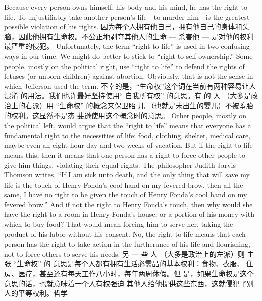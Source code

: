 \begin{paracol}{2}
Because every person owns himself, his body and his mind, he
has the right to life. To unjustifiably take another person's
life---to murder him---is the greatest possible violation of his
rights.
\switchcolumn
因为每个人拥有他自己，拥有他自己的身体和头脑，因此他拥有生命权。不公正地剥夺其他人的生命 --- 杀害他 --- 是对他的权利最严重的侵犯。
\switchcolumn*
Unfortunately, the term ``right to life'' is used in two confusing ways in our time. We might do better to stick to ``right to self-ownership.'' Some people, mostly on the political right, use
``right to life'' to defend the rights of fetuses (or unborn children) against abortion. Obviously, that is not the sense in which Jefferson used the term.
\switchcolumn
不幸的是，“生命权”这个词在当前有两种容易让人混淆
的用法。我们也许最好坚持使用“ 自我所有权” 的意思。有
的 人 （大多是政治上的右派）用 “生命权” 的概念来保卫胎
儿 （也就是未出生的婴儿）不被堕胎的权利。这显然不是杰
斐逊使用这个概念时的意思。
\switchcolumn
Other people, mostly on the political left, would argue that
the ``right to life'' means that everyone has a fundamental right
to the necessities of life: food, clothing, shelter, medical care,
maybe even an eight-hour day and two weeks of vacation. But
if the right to life means this, then it means that one person has
a right to force other people to give him things, violating their
equal rights. The philosopher Judith Jarvis Thomson writes, ``If
I am sick unto death, and the only thing that will save my life is
the touch of Henry Fonda's cool hand on my fevered brow, then
all the same, I have no right to be given the touch of Henry
Fonda's cool hand on my fevered brow.'' And if not the right to
Henry Fonda's touch, then why would she have the right to a
room in Henry Fonda's house, or a portion of his money with
which to buy food? That would mean forcing him to serve her,
taking the product of his labor without his consent. No, the
right to life means that each person has the right to take action
in the furtherance of his life and flourishing, not to force others
to serve his needs.
\switchcolumn
另 一 些 人 （大多是政治上的左派）则 主 张 “生命权” 的
意思是每个人都有拥有生活必需品的基本权利：食物、衣服、
住房、医疗，甚至还有每天工作八小时，每年两周休假。但
是，如果生命权是这个意思的话，也就意味着一个人有权强迫
其他人给他提供这些东西，这就侵犯了别人的平等权利。哲学

\end{paracol}
